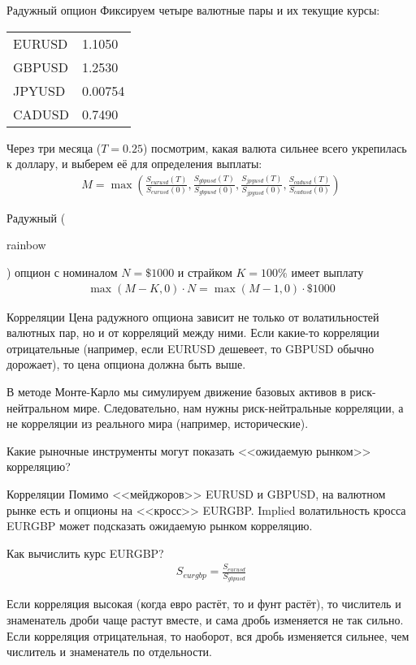 \documentclass{beamer}
\newcommand{\en}[1]{\begin{otherlanguage}{english}#1\end{otherlanguage}}
\begin{document}
\begin{frame}{Радужный опцион}
\justify
Фиксируем четыре валютные пары и их текущие курсы:

\centering
\begin{tabular}{l|l}
EURUSD & 1.1050 \\
GBPUSD & 1.2530 \\
JPYUSD & 0.00754 \\
CADUSD & 0.7490
\end{tabular}

\justify
Через три месяца ($T=0.25$) посмотрим, какая валюта сильнее всего укрепилась к доллару, и выберем её для определения выплаты:
\begin{align*}
M = \max\left(\frac{S_{eurusd}(T)}{S_{eurusd}(0)}, \frac{S_{gbpusd}(T)}{S_{gbpusd}(0)}, \frac{S_{jpyusd}(T)}{S_{jpyusd}(0)}, \frac{S_{cadusd}(T)}{S_{cadusd}(0)} \right)
\end{align*}

\justify 
Радужный (\en{rainbow}) опцион с номиналом $N=\$1000$ и страйком $K=100\%$ имеет выплату
\begin{align*}
\max(M - K, 0) \cdot N = \max(M-1, 0) \cdot \$1000
\end{align*}
\end{frame}



\begin{frame}{Корреляции}
\justify
Цена радужного опциона зависит не только от волатильностей валютных пар, но и от корреляций между ними. Если какие-то корреляции отрицательные (например, если EURUSD дешевеет, то GBPUSD обычно дорожает), то цена опциона должна быть выше.

\justify
В методе Монте-Карло мы симулируем движение базовых активов в риск-нейтральном мире. Следовательно, нам нужны риск-нейтральные корреляции, а не корреляции из реального мира (например, исторические).

\justify
Какие рыночные инструменты могут показать <<ожидаемую рынком>> корреляцию?
\end{frame}



\begin{frame}{Корреляции}
\justify
Помимо <<мейджоров>> EURUSD и GBPUSD, на валютном рынке есть и опционы на <<кросс>> EURGBP. Implied волатильность кросса EURGBP может подсказать ожидаемую рынком корреляцию.

\justify
Как вычислить курс EURGBP?
\begin{align*}
S_{eurgbp} = \frac{S_{eurusd}}{S_{gbpusd}}
\end{align*}

\justify
Если корреляция высокая (когда евро растёт, то и фунт растёт), то числитель и знаменатель дроби чаще растут вместе, и сама дробь изменяется не так сильно. Если корреляция отрицательная, то наоборот, вся дробь изменяется сильнее, чем числитель и знаменатель по отдельности.
\end{frame}
\end{document}

